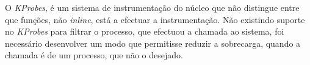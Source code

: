 





O \textit{KProbes}, é um sistema de instrumentação do núcleo que não distingue entre que funções, não \textit{inline}, está a efectuar a instrumentação.
Não existindo suporte no \textit{KProbes} para filtrar o processo, que efectuou a chamada ao sistema, foi necessário desenvolver um modo que permitisse reduzir a sobrecarga, quando a chamada é de um processo, que não o desejado.




